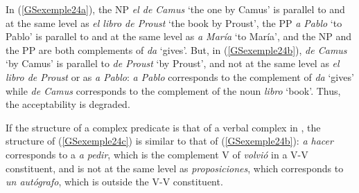 \eal
	\label{GSexemple24} 
	\label{GSexemple24a}
	
	\label{GSexemple24b}
	
	\label{GSexemple24c}
\zl

\noindent
In (\ref{GSexemple24a}), the NP \emph{el de Camus} `the one by Camus' is parallel to and at the same level as \emph{el libro de Proust} `the book by Proust', the PP \emph{a Pablo} `to Pablo' is parallel to and at the same level as \emph{a Mar\'ia} `to Mar\'ia', and the NP and the PP are both complements of \emph{da} `gives'. But, in (\ref{GSexemple24b}), \emph{de Camus} `by Camus' is parallel to \emph{de Proust} `by Proust', and not at the same level as \emph{el libro de Proust} or as \emph{a Pablo}: \emph{a Pablo} corresponds to the complement of \emph{da} `gives' while \emph{de Camus} corresponds to the complement of the noun \emph{libro} `book'. Thus, the acceptability is degraded. 

If the structure of a complex predicate is that of a verbal complex in , the structure of (\ref{GSexemple24c}) is similar to that of (\ref{GSexemple24b}): \emph{a hacer} corresponds to a \emph{a pedir}, which is the complement V of \emph{volvi\'o} in a V-V constituent, and is not at the same level as \emph{proposiciones}, which corresponds to \emph{un aut\'ografo}, which is outside the V-V constituent.   

